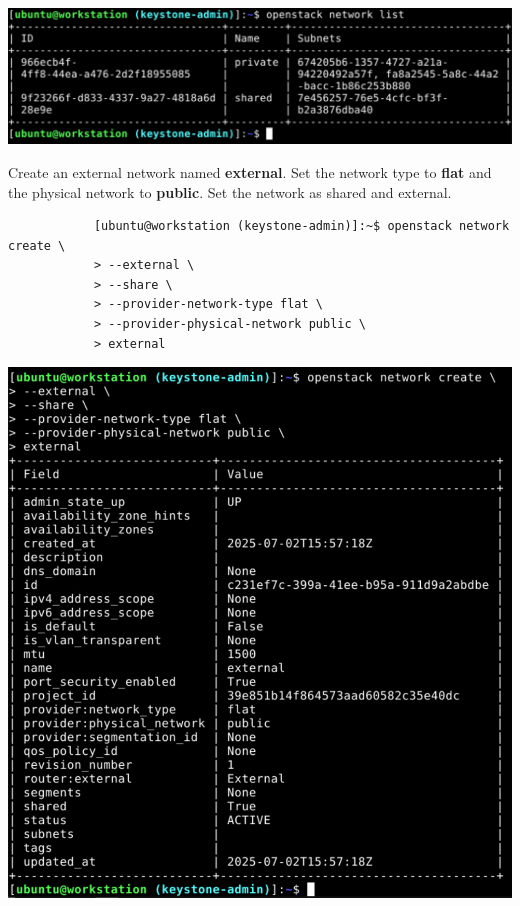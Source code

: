 \documentclass[letterpaper, 12pt]{article}
\begin{document}
\begin{enumerate}
\begin{labstep}
        \begin{center}
            \includegraphics[width=\linewidth]{images/part5/step9.png}
        \end{center}
    \end{labstep}

    \begin{labstep}
        Create an external network named \textbf{external}.
        Set the network type to \textbf{flat} and the physical network to \textbf{public}.
        Set the network as shared and external.
        \begin{lstlisting}
            [ubuntu@workstation (keystone-admin)]:~$ openstack network create \
            > --external \
            > --share \
            > --provider-network-type flat \
            > --provider-physical-network public \
            > external
        \end{lstlisting}

        \begin{center}
            \includegraphics[width=\linewidth]{images/part5/step10.png}
        \end{center}
    \end{labstep}


\end{enumerate}
\end{document}
